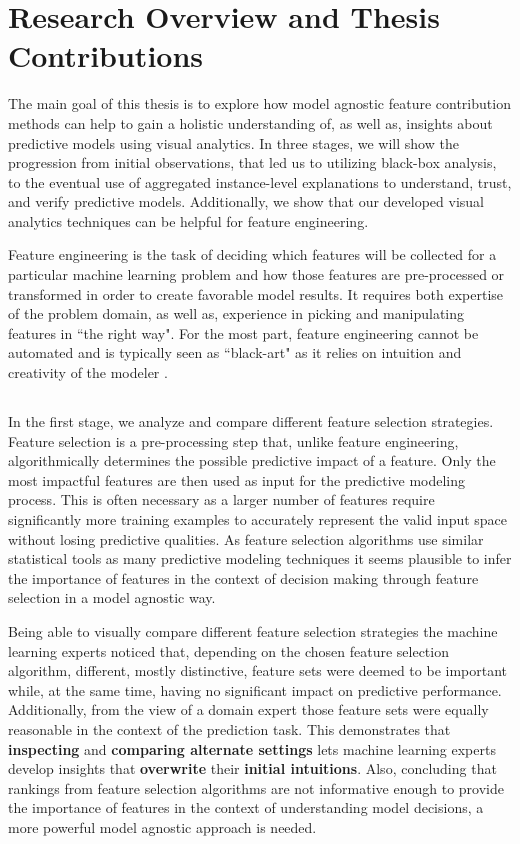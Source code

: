 \section{Research Overview and Thesis Contributions}
\label{sec:corecontributions}
The main goal of this thesis is to explore how model agnostic feature contribution methods can help to gain a holistic understanding of, as well as, insights about predictive models using visual analytics. In three stages, we will show the progression from initial observations, that led us to utilizing black-box analysis, to the eventual use of aggregated instance-level explanations to understand, trust, and verify predictive models. Additionally, we show that our developed visual analytics techniques can be helpful for feature engineering.

Feature engineering is the task of deciding which features will be collected for a particular machine learning problem and how those features are pre-processed or transformed in order to create favorable model results. It requires both expertise of the problem domain, as well as, experience in picking and manipulating features in ``the right way". For the most part, feature engineering cannot be automated and is typically seen as ``black-art" as it relies on intuition and creativity of the modeler \cite{Domingos:2012:FUT:2347736.2347755}.

\subsection{\emph{\infuse}}
In the first stage, we analyze and compare different feature selection strategies. Feature selection is a pre-processing step that, unlike feature engineering, algorithmically determines the possible predictive impact of a feature. Only the most impactful features are then used as input for the predictive modeling process. This is often necessary as a larger number of features require significantly more training examples to accurately represent the valid input space without losing predictive qualities. As feature selection algorithms use similar statistical tools as many predictive modeling techniques it seems plausible to infer the importance of features in the context of decision making through feature selection in a model agnostic way.

Being able to visually compare different feature selection strategies the machine learning experts noticed that, depending on the chosen feature selection algorithm, different, mostly distinctive, feature sets were deemed to be important while, at the same time, having no significant impact on predictive performance. Additionally, from the view of a domain expert those feature sets were equally reasonable in the context of the prediction task.
This demonstrates that \textbf{inspecting} and \textbf{comparing alternate settings} lets machine learning experts develop insights that \textbf{overwrite} their \textbf{initial intuitions}.
Also, concluding that rankings from feature selection algorithms are not informative enough to provide the importance of features in the context of understanding model decisions, a more powerful model agnostic approach is needed.

